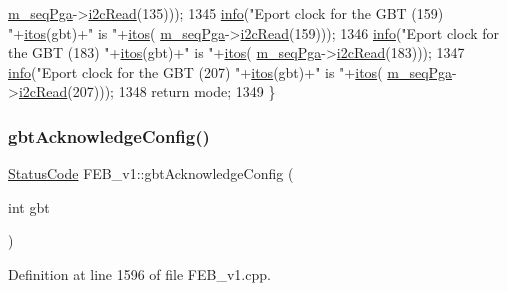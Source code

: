 \begin{DoxyCode}
      \hyperlink{classFEB__v1_a6c7804ac86796f233a8393043adf2e77}{m\_seqPga}->\hyperlink{classSeqPGA_a7cd344df2be99f3a02b487f80e87b27e}{i2cRead}(135)));
1345   \hyperlink{classObject_a644fd329ea4cb85f54fa6846484b84a8}{info}(\textcolor{stringliteral}{"Eport clock for the GBT (159) "}+\hyperlink{Tools_8h_af330027dbdafb9a30768b3613c553e60}{itos}(gbt)+\textcolor{stringliteral}{" is "}+\hyperlink{Tools_8h_af330027dbdafb9a30768b3613c553e60}{itos}(
      \hyperlink{classFEB__v1_a6c7804ac86796f233a8393043adf2e77}{m\_seqPga}->\hyperlink{classSeqPGA_a7cd344df2be99f3a02b487f80e87b27e}{i2cRead}(159)));
1346   \hyperlink{classObject_a644fd329ea4cb85f54fa6846484b84a8}{info}(\textcolor{stringliteral}{"Eport clock for the GBT (183) "}+\hyperlink{Tools_8h_af330027dbdafb9a30768b3613c553e60}{itos}(gbt)+\textcolor{stringliteral}{" is "}+\hyperlink{Tools_8h_af330027dbdafb9a30768b3613c553e60}{itos}(
      \hyperlink{classFEB__v1_a6c7804ac86796f233a8393043adf2e77}{m\_seqPga}->\hyperlink{classSeqPGA_a7cd344df2be99f3a02b487f80e87b27e}{i2cRead}(183)));
1347   \hyperlink{classObject_a644fd329ea4cb85f54fa6846484b84a8}{info}(\textcolor{stringliteral}{"Eport clock for the GBT (207) "}+\hyperlink{Tools_8h_af330027dbdafb9a30768b3613c553e60}{itos}(gbt)+\textcolor{stringliteral}{" is "}+\hyperlink{Tools_8h_af330027dbdafb9a30768b3613c553e60}{itos}(
      \hyperlink{classFEB__v1_a6c7804ac86796f233a8393043adf2e77}{m\_seqPga}->\hyperlink{classSeqPGA_a7cd344df2be99f3a02b487f80e87b27e}{i2cRead}(207)));
1348   \textcolor{keywordflow}{return} mode; 
1349 \}
\end{DoxyCode}
\mbox{\label{classFEB__v1_af7e7f3cb7269dc811866bc42585cf020}} 
\subsubsection{\texorpdfstring{gbt\+Acknowledge\+Config()}{gbtAcknowledgeConfig()}}
{\footnotesize\ttfamily \hyperlink{classStatusCode}{Status\+Code} F\+E\+B\+\_\+v1\+::gbt\+Acknowledge\+Config (\begin{DoxyParamCaption}\item[{int}]{gbt }\end{DoxyParamCaption})}



Definition at line 1596 of file F\+E\+B\+\_\+v1.\+cpp.



